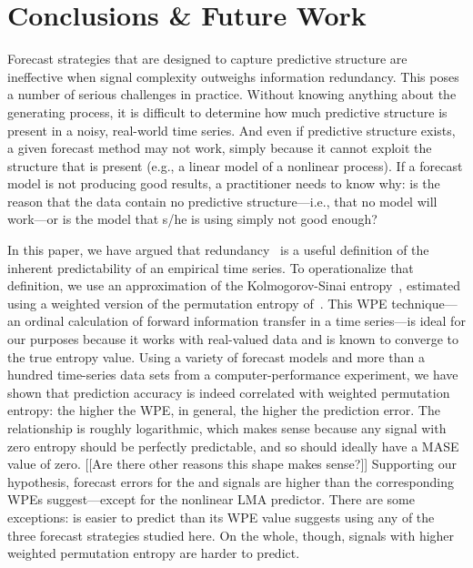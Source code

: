 \section{ Conclusions \& Future Work }\label{sec:conc}

Forecast strategies that are designed to capture predictive structure
are ineffective when signal complexity outweighs information
redundancy.  This poses a number of serious challenges in practice.
Without knowing anything about the generating process, it is difficult
to determine how much predictive structure is present in a noisy,
real-world time series.  And even if predictive structure exists, a
given forecast method may not work, simply because it cannot exploit
the structure that is present (e.g., a linear model of a nonlinear
process).  If a forecast model is not producing good results, a
practitioner needs to know why: is the reason that the data contain no
predictive structure---i.e., that no model will work---or is the model
that s/he is using simply not good enough?

In this paper, we have argued that redundancy~\cite{crutchfield2003}
is a useful definition of the inherent predictability of an empirical
time series.  To operationalize that definition, we use an
approximation of the Kolmogorov-Sinai entropy~\cite{lind95}, estimated
using a weighted version of the permutation entropy
of~\cite{bandt2002per}.  This WPE technique---an ordinal calculation
of forward information transfer in a time series---is ideal for our
purposes because it works with real-valued data and is known to
converge to the true entropy value. Using a variety of forecast models
and more than a hundred time-series data sets from a
computer-performance experiment, we have shown that prediction
accuracy is indeed correlated with weighted permutation entropy: the
higher the WPE, in general, the higher the prediction error.  The
relationship is roughly logarithmic, which makes sense because any
signal with zero entropy should be perfectly predictable, and so
should ideally have a MASE value of zero.  [[Are there other reasons
    this shape makes sense?]]  Supporting our hypothesis, forecast
errors for the \col and \svdfive signals are higher than the
corresponding WPEs suggest---except for the nonlinear LMA predictor.
There are some exceptions: \svdone is easier to predict than its WPE
value suggests using any of the three forecast strategies studied
here.  On the whole, though, signals with higher weighted permutation
entropy are harder to predict.

